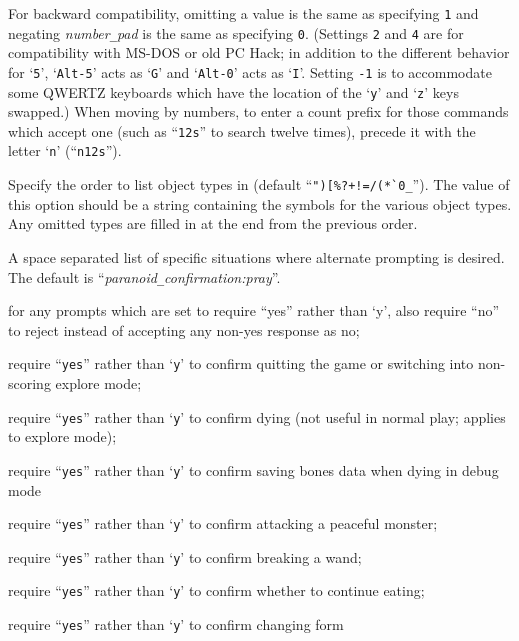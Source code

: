 For backward compatibility, omitting a value is the same as specifying {\tt 1}
and negating
{\it number\verb+_+pad\/}
is the same as specifying {\tt 0}.
(Settings {\tt 2} and {\tt 4} are for compatibility with MS-DOS or old PC Hack;
in addition to the different behavior for `{\tt 5}', `{\tt Alt-5}' acts as `{\tt G}'
and `{\tt Alt-0}' acts as `{\tt I}'.
Setting {\tt -1} is to accommodate some QWERTZ keyboards which have the
location of the `{\tt y}' and `{\tt z}' keys swapped.)
When moving by numbers, to enter a count prefix for those commands
which accept one (such as ``{\tt 12s}'' to search twelve times), precede it
with the letter `{\tt n}' (``{\tt n12s}'').
\item[\ib{packorder}]
Specify the order to list object types in (default
``\verb&")[%?+!=/(*`0_&''). The value of this option should be a string
containing the symbols for the various object types.  Any omitted types
are filled in at the end from the previous order.
\item[\ib{paranoid\verb+_+confirmation}]
A space separated list of specific situations where alternate
prompting is desired.  The default is ``{\it paranoid\verb+_+confirmation:pray}''.
\newlength{\pcwidth}
\settowidth{\pcwidth}{\tt Were-change}
\addtolength{\pcwidth}{\labelsep}
\blist{\leftmargin \pcwidth \topsep 1mm \itemsep 0mm}
\item[{\tt Confirm}]
for any prompts which are set to require ``yes''
rather than `y', also require ``no'' to reject instead
of accepting any non-yes response as no;
\item[{\tt quit~~~}]
require ``{\tt yes}'' rather than `{\tt y}' to confirm quitting
the game or switching into non-scoring explore mode;
\item[{\tt die~~~~}]
require ``{\tt yes}'' rather than `{\tt y}' to confirm dying (not
useful in normal play; applies to explore mode);
\item[{\tt bones~~}]
require ``{\tt yes}'' rather than `{\tt y}' to confirm saving
bones data when dying in debug mode
\item[{\tt attack~}]
require ``{\tt yes}'' rather than `{\tt y}' to confirm attacking
a peaceful monster;
\item[{\tt wand-break}]
require ``{\tt yes}'' rather than `{\tt y}' to confirm breaking
a wand;
\item[{\tt eating}]
require ``{\tt yes}'' rather than `{\tt y}' to confirm whether to
continue eating;
\item[{\tt Were-change}]
require ``{\tt yes}'' rather than `{\tt y}' to confirm changing form
